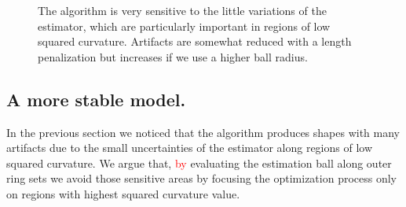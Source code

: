 \documentclass[smallextended]{svjour3}       %
\newcommand{\revision}[1]{\textcolor{red}{#1}}
\begin{document}
\begin{figure}[!h]
\begin{minipage}[b]{0.33\textwidth}
{	}%
\end{minipage}%
\begin{minipage}[b]{0.33\textwidth}
\end{minipage}%
\caption{The algorithm is very sensitive to the little variations of the estimator, which are particularly important in regions of low squared curvature. Artifacts are somewhat reduced with a length penalization but increases if we use a higher ball radius. }
\label{fig:m1-square-flow}
\end{figure}


\subsection{A more stable model.}
In the previous section we noticed that the algorithm produces shapes with many artifacts due to the small uncertainties
of the estimator along regions of low squared curvature. We argue that, \revision{by} evaluating the estimation ball along outer
ring sets we avoid those sensitive areas by focusing the optimization process only on regions with highest squared
curvature value.
\end{document}
